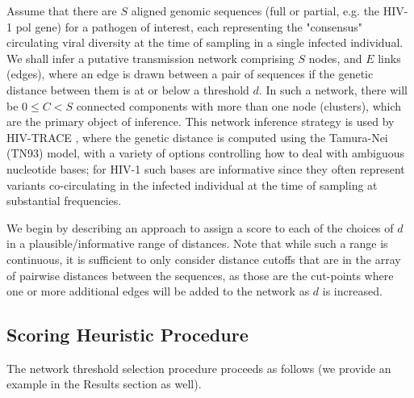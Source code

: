 \documentclass[utf8]{FrontiersinHarvard} %
\begin{document}
Assume that there are $S$ aligned genomic sequences (full or partial, e.g. the
HIV-1 pol gene) for a pathogen of interest, each representing the "consensus" circulating
viral diversity at the time of sampling in a single infected individual. We
shall infer a putative transmission network comprising $S$ nodes, and $E$ links
(edges), where an edge is drawn between a pair of sequences if the genetic
distance between them is at or below a threshold $d$. In such a network, there will
be $0 \leq C < S$ connected components with more than one node (clusters), which are the primary
object of inference. This network inference strategy is used by HIV-TRACE
\citep{kosakovsky_pond_hiv-trace_2018}, where the genetic distance is computed
using the Tamura-Nei (TN93) \citep{tamura_estimation_1993} model, with a
variety of options controlling how to deal with ambiguous nucleotide bases; for
HIV-1 such bases are informative since they often represent variants
co-circulating in the infected individual at the time of sampling at substantial frequencies.

We begin by describing an approach to assign a score to each of the choices of
$d$ in a plausible/informative range of distances. Note that while such a range
is continuous, it is sufficient to only consider distance cutoffs that are in
the array of pairwise distances between the sequences, as those are the
cut-points where one or more additional edges will be added to the network as
$d$ is increased.

\subsection{Scoring Heuristic Procedure}

The network threshold selection procedure proceeds as follows (we provide an example in the Results section as well).
\end{document}
